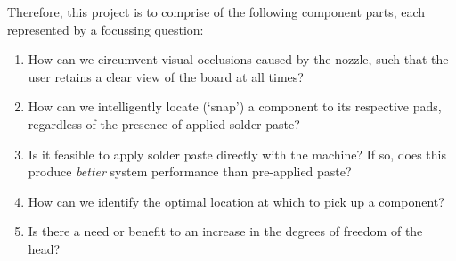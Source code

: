 \documentclass [11pt]{article}
\begin{document}
Therefore, this project is to comprise of the following component parts, each represented by a focussing question:
\begin{enumerate}
	\item How can we circumvent visual occlusions caused by the nozzle, such that the user retains a clear view of the board at all times?
	\item How can we intelligently locate (`snap') a component to its respective pads, regardless of the presence of applied solder paste?
	\item Is it feasible to apply solder paste directly with the machine? If so, does this produce \emph{better} system performance than pre-applied paste?
	\item How can we identify the optimal location at which to pick up a component?
	\item Is there a need or benefit to an increase in the degrees of freedom of the head?
\end{enumerate}

\nocite{*}


\end{document}
